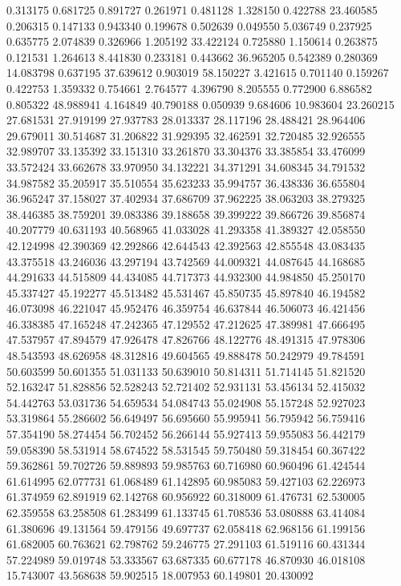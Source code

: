 0.313175
0.681725
0.891727
0.261971
0.481128
1.328150
0.422788
23.460585
0.206315
0.147133
0.943340
0.199678
0.502639
0.049550
5.036749
0.237925
0.635775
2.074839
0.326966
1.205192
33.422124
0.725880
1.150614
0.263875
0.121531
1.264613
8.441830
0.233181
0.443662
36.965205
0.542389
0.280369
14.083798
0.637195
37.639612
0.903019
58.150227
3.421615
0.701140
0.159267
0.422753
1.359332
0.754661
2.764577
4.396790
8.205555
0.772900
6.886582
0.805322
48.988941
4.164849
40.790188
0.050939
9.684606
10.983604
23.260215
27.681531
27.919199
27.937783
28.013337
28.117196
28.488421
28.964406
29.679011
30.514687
31.206822
31.929395
32.462591
32.720485
32.926555
32.989707
33.135392
33.151310
33.261870
33.304376
33.385854
33.476099
33.572424
33.662678
33.970950
34.132221
34.371291
34.608345
34.791532
34.987582
35.205917
35.510554
35.623233
35.994757
36.438336
36.655804
36.965247
37.158027
37.402934
37.686709
37.962225
38.063203
38.279325
38.446385
38.759201
39.083386
39.188658
39.399222
39.866726
39.856874
40.207779
40.631193
40.568965
41.033028
41.293358
41.389327
42.058550
42.124998
42.390369
42.292866
42.644543
42.392563
42.855548
43.083435
43.375518
43.246036
43.297194
43.742569
44.009321
44.087645
44.168685
44.291633
44.515809
44.434085
44.717373
44.932300
44.984850
45.250170
45.337427
45.192277
45.513482
45.531467
45.850735
45.897840
46.194582
46.073098
46.221047
45.952476
46.359754
46.637844
46.506073
46.421456
46.338385
47.165248
47.242365
47.129552
47.212625
47.389981
47.666495
47.537957
47.894579
47.926478
47.826766
48.122776
48.491315
47.978306
48.543593
48.626958
48.312816
49.604565
49.888478
50.242979
49.784591
50.603599
50.601355
51.031133
50.639010
50.814311
51.714145
51.821520
52.163247
51.828856
52.528243
52.721402
52.931131
53.456134
52.415032
54.442763
53.031736
54.659534
54.084743
55.024908
55.157248
52.927023
53.319864
55.286602
56.649497
56.695660
55.995941
56.795942
56.759416
57.354190
58.274454
56.702452
56.266144
55.927413
59.955083
56.442179
59.058390
58.531914
58.674522
58.531545
59.750480
59.318454
60.367422
59.362861
59.702726
59.889893
59.985763
60.716980
60.960496
61.424544
61.614995
62.077731
61.068489
61.142895
60.985083
59.427103
62.226973
61.374959
62.891919
62.142768
60.956922
60.318009
61.476731
62.530005
62.359558
63.258508
61.283499
61.133745
61.708536
53.080888
63.414084
61.380696
49.131564
59.479156
49.697737
62.058418
62.968156
61.199156
61.682005
60.763621
62.798762
59.246775
27.291103
61.519116
60.431344
57.224989
59.019748
53.333567
63.687335
60.677178
46.870930
46.018108
15.743007
43.568638
59.902515
18.007953
60.149801
20.430092
